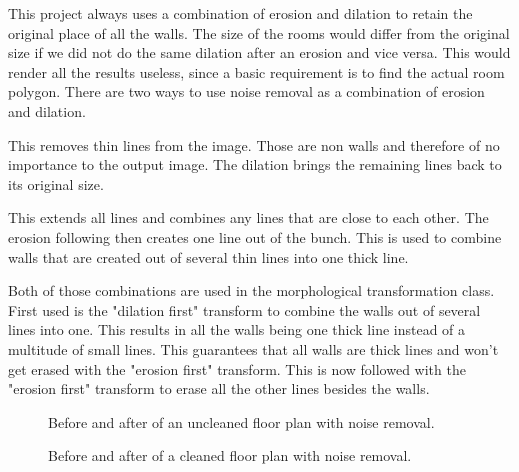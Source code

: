 This project always uses a combination of erosion and dilation to retain the original place of all the walls. The size of the rooms would differ from the original size if we did not do the same dilation after an erosion and vice versa. This would render all the results useless, since a basic requirement is to find the actual room polygon. There are two ways to use noise removal as a combination of erosion and dilation. 

\begin{description}[style=nextline]
	\item[Erosion first] This removes thin lines from the image. Those are non walls and therefore of no importance to the output image. The dilation brings the remaining lines back to its original size.
	\item[Dilation first] This extends all lines and combines any lines that are close to each other. The erosion following then creates one line out of the bunch. This is used to combine walls that are created out of several thin lines into one thick line.
\end{description}

Both of those combinations are used in the morphological transformation class. First used is the "dilation first" transform to combine the walls out of several lines into one. This results in all the walls being one thick line instead of a multitude of small lines. This guarantees that all walls are thick lines and won't get erased with the "erosion first" transform. This is now followed with the "erosion first" transform to erase all the other lines besides the walls. 

\begin{figure}[H]
	\centering
	\hfill
	\caption{Before and after of an uncleaned floor plan with noise removal. }
\end{figure}

\begin{figure}[H]
	\centering
	\hfill
	\caption{Before and after of a cleaned floor plan with noise removal.}
\end{figure}

